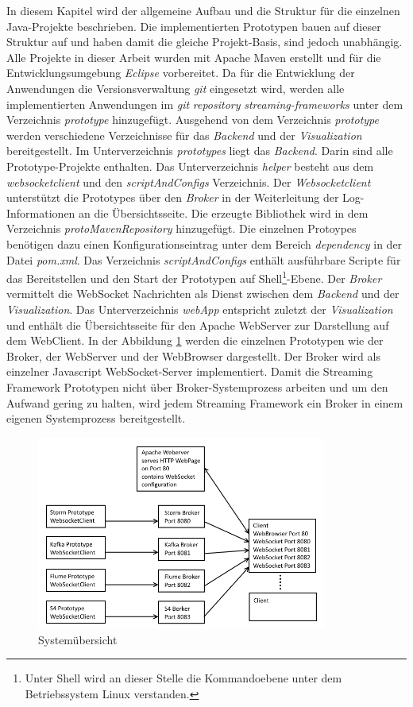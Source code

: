 In diesem Kapitel wird der allgemeine Aufbau und die Struktur für die einzelnen Java-Projekte beschrieben. Die implementierten Prototypen bauen auf dieser Struktur auf und haben damit die gleiche Projekt-Basis, sind jedoch unabhängig. Alle Projekte in dieser Arbeit wurden mit Apache Maven erstellt und für die Entwicklungsumgebung \textit{Eclipse} vorbereitet. Da für die Entwicklung der Anwendungen die Versionsverwaltung \textit{git} eingesetzt wird, werden alle implementierten Anwendungen im \textit{git} \textit{repository} \textit{streaming-frameworks} unter dem Verzeichnis \textit{prototype} hinzugefügt. Ausgehend von dem Verzeichnis \textit{prototype} werden verschiedene Verzeichnisse für das \textit{Backend} und der \textit{Visualization} bereitgestellt. Im Unterverzeichnis \textit{prototypes} liegt das \textit{Backend}. Darin sind alle Prototype-Projekte enthalten. Das Unterverzeichnis \textit{helper} besteht aus dem \textit{websocketclient} und den \textit{scriptAndConfigs} Verzeichnis. Der \textit{Websocketclient} unterstützt die Prototypes über den \textit{Broker} in der Weiterleitung der Log-Informationen an die Übersichtsseite. Die erzeugte Bibliothek wird in dem Verzeichnis \textit{protoMavenRepository} hinzugefügt. Die einzelnen Protoypes benötigen dazu einen Konfigurationseintrag unter dem Bereich \textit{dependency} in der Datei \textit{pom.xml}. Das Verzeichnis \textit{scriptAndConfigs} enthält ausführbare Scripte für das Bereitstellen und den Start der Prototypen auf Shell\footnote{Unter Shell wird an dieser Stelle die Kommandoebene unter dem Betriebssystem Linux verstanden.}-Ebene. Der \textit{Broker} vermittelt die WebSocket Nachrichten als Dienst zwischen dem \textit{Backend} und der \textit{Visualization}. Das Unterverzeichnis \textit{webApp} entspricht zuletzt der \textit{Visualization} und enthält die Übersichtsseite für den Apache WebServer zur Darstellung auf dem WebClient. In der Abbildung \ref{fig:systemOverview} werden die einzelnen Prototypen wie der Broker, der WebServer und der WebBrowser dargestellt. Der Broker wird als einzelner Javascript WebSocket-Server implementiert. Damit die Streaming Framework Prototypen nicht über Broker-Systemprozess arbeiten und um den Aufwand gering zu halten, wird jedem Streaming Framework ein Broker in einem eigenen Systemprozess bereitgestellt.

\begin{figure}[htb!]
\centering
\includegraphics[width=0.85\textwidth]{bilder/SystemOverview.png}
\caption{Systemübersicht
\label{fig:systemOverview}}
\end{figure}

